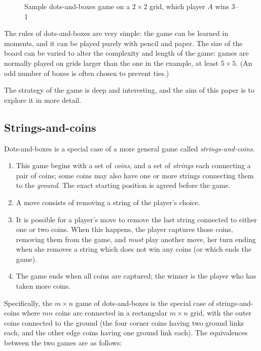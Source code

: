 \documentclass[a4paper,twocolumn]{article}
\begin{document}
\begin{figure*}
  \centering
  \def\svgscale{0.7}
  
  \caption{Sample dots-and-boxes game on a $2 \times 2$ grid, which
    player $A$ wins 3--1}
  \label{sampledab}
\end{figure*}

The rules of dots-and-boxes are very simple: the game can be learned
in moments, and it can be played purely with pencil and paper. The
size of the board can be varied to alter the complexity and length of
the game: games are normally played on grids larger than the one in
the example, at least $5 \times 5$. (An odd number of boxes is often
chosen to prevent ties.)

The strategy of the game is deep and interesting, and the aim of this
paper is to explore it in more detail.

\subsection{Strings-and-coins}

Dots-and-boxes is a special case of a more general game called
\emph{strings-and-coins}.

\begin{enumerate}
  \item This game begins with a set of \emph{coins}, and a set of
    \emph{strings} each connecting a pair of coins; some coins may
    also have one or more strings connecting them to the
    \emph{ground}. The exact starting position is agreed before the
    game.
  \item A move consists of removing a string of the player's choice.
  \item It is possible for a player's move to remove the last string
    connected to either one or two coins. When this happens, the
    player captures those coins, removing them from the game, and
    \emph{must} play another move, her turn ending when she removes a
    string which does not win any coins (or which ends the game).
  \item The game ends when all coins are captured; the winner is the
    player who has taken more coins.
\end{enumerate}

Specifically, the $m \times n$ game of dots-and-boxes is the special
case of strings-and-coins where $mn$ coins are connected in a
rectangular $m \times n$ grid, with the outer coins connected to the
ground (the four corner coins having two ground links each, and the
other edge coins having one ground link each). The equivalences
between the two games are as follows:
\end{document}
